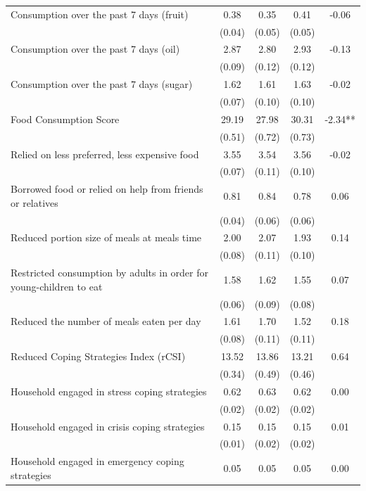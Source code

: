 \begin{tabular}{@{\extracolsep{5pt}}lcccc}
Consumption over the past 7 days (fruit)   & 0.38    & 0.35    & 0.41    & -0.06   \\
 & (0.04)  & (0.05)  & (0.05)  &  \\ [1ex]
Consumption over the past 7 days (oil)   & 2.87    & 2.80    & 2.93    & -0.13   \\
 & (0.09)  & (0.12)  & (0.12)  &  \\ [1ex]
Consumption over the past 7 days (sugar)   & 1.62    & 1.61    & 1.63    & -0.02   \\
 & (0.07)  & (0.10)  & (0.10)  &  \\ [1ex]
Food Consumption Score   & 29.19    & 27.98    & 30.31    & -2.34**   \\
 & (0.51)  & (0.72)  & (0.73)  &  \\ [1ex]
Relied on less preferred, less expensive food   & 3.55    & 3.54    & 3.56    & -0.02   \\
 & (0.07)  & (0.11)  & (0.10)  &  \\ [1ex]
Borrowed food or relied on help from friends or relatives   & 0.81    & 0.84    & 0.78    & 0.06   \\
 & (0.04)  & (0.06)  & (0.06)  &  \\ [1ex]
Reduced portion size of meals at meals time   & 2.00    & 2.07    & 1.93    & 0.14   \\
 & (0.08)  & (0.11)  & (0.10)  &  \\ [1ex]
Restricted consumption by adults in order for young-children to eat   & 1.58    & 1.62    & 1.55    & 0.07   \\
 & (0.06)  & (0.09)  & (0.08)  &  \\ [1ex]
Reduced the number of meals eaten per day   & 1.61    & 1.70    & 1.52    & 0.18   \\
 & (0.08)  & (0.11)  & (0.11)  &  \\ [1ex]
Reduced Coping Strategies Index (rCSI)   & 13.52    & 13.86    & 13.21    & 0.64   \\
 & (0.34)  & (0.49)  & (0.46)  &  \\ [1ex]
Household engaged in stress coping strategies   & 0.62    & 0.63    & 0.62    & 0.00   \\
 & (0.02)  & (0.02)  & (0.02)  &  \\ [1ex]
Household engaged in crisis coping strategies   & 0.15    & 0.15    & 0.15    & 0.01   \\
 & (0.01)  & (0.02)  & (0.02)  &  \\ [1ex]
Household engaged in emergency coping strategies   & 0.05    & 0.05    & 0.05    & 0.00   \\

\end{tabular}
